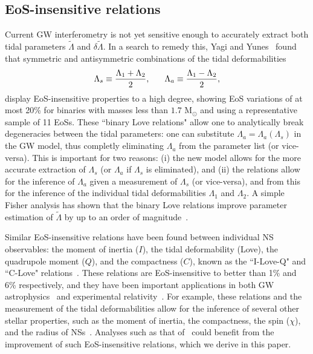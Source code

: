 \documentclass[prd,twocolumn,nofootinbib,superscriptaddress,amsmath,amssymb]{revtex4-1}
\begin{document}
\subsection{EoS-insensitive relations}\label{sec:eosInsensitive}
Current GW interferometry is not yet sensitive enough to accurately extract both tidal parameters $\tilde{\Lambda}$ and $\delta\tilde{\Lambda}$.
In a search to remedy this, Yagi and Yunes~\cite{Yagi:binLove} found that symmetric and antisymmetric combinations of the tidal deformabilities
\begin{equation}
\Lambda_s \equiv \frac{\Lambda_1 + \Lambda_2}{2}, \hspace{6mm} \Lambda_a \equiv \frac{\Lambda_1 - \Lambda_2}{2},
\end{equation}
display EoS-insensitive properties to a high degree, showing EoS variations of at most 20\% for binaries with masses less than $1.7 \text{ M}_{\odot}$ and using a representative sample of 11 EoSs. 
These ``binary Love relations" allow one to analytically break degeneracies between the tidal parameters: one can substitute $\Lambda_{a}=\Lambda_{a}(\Lambda_{s})$ in the GW model, thus completly eliminating $\Lambda_{a}$ from the parameter list (or vice-versa). This is important for two reasons: (i) the new model allows for the more accurate extraction of $\Lambda_{s}$ (or $\Lambda_{a}$ if $\Lambda_{s}$ is eliminated), and (ii) the relations allow for the inference of $\Lambda_{a}$ given a measurement of $\Lambda_{s}$ (or vice-versa), and from this for the inference of the individual tidal deformabilities $\Lambda_{1}$ and $\Lambda_{2}$. A simple Fisher analysis has shown that the binary Love relations improve parameter estimation of $\tilde{\Lambda}$ by up to an order of magnitude~\cite{Yagi:2015pkc,Yagi:binLove}.

Similar EoS-insensitive relations have been found between individual NS observables: the moment of inertia ($I$), the tidal deformability (Love), the quadrupole moment ($Q$), and the compactness ($C$), known as the ``I-Love-Q" and ``C-Love" relations~\cite{Yagi:2013bca,Yagi:ILQ, Maselli:2013mva}.
These relations are EoS-insensitive to better than 1\% and 6\% respectively, and they have been important applications in both GW astrophysics~\cite{Kumar:2019xgp} and experimental relativity~\cite{Yagi:2013bca,Yagi:ILQ,Gupta:2017vsl,Doneva:2017jop}. For example, these relations and the measurement of the tidal deformabilities allow for the inference of several other stellar properties, such as the moment of inertia, the  compactness, the spin ($\chi$), and the radius of NSs~\cite{Kumar:2019xgp}.
Analyses such as that of~\cite{Kumar:2019xgp} could benefit from the improvement of such EoS-insensitive relations, which we derive in this paper. 
\end{document}
